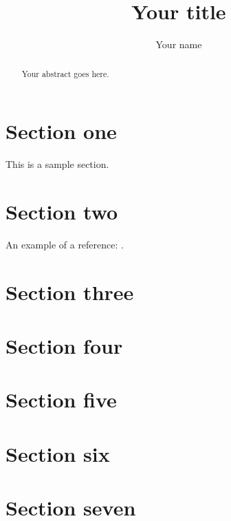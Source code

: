 \documentclass[11pt]{article} %
\title{Your title}
\author{Your name}
\theoremstyle{plain}
\theoremstyle{definition}
\begin{document}
\maketitle

\declaration

\begin{abstract}
  Your abstract goes here.
\end{abstract}

\section{Section one}

This is a sample section.

\section{Section two}

An example of a reference:
\cite{hastie/etal:2009}.



\section{Section three}
\section{Section four}
\section{Section five}
\section{Section six}
\section{Section seven}



\end{document}

